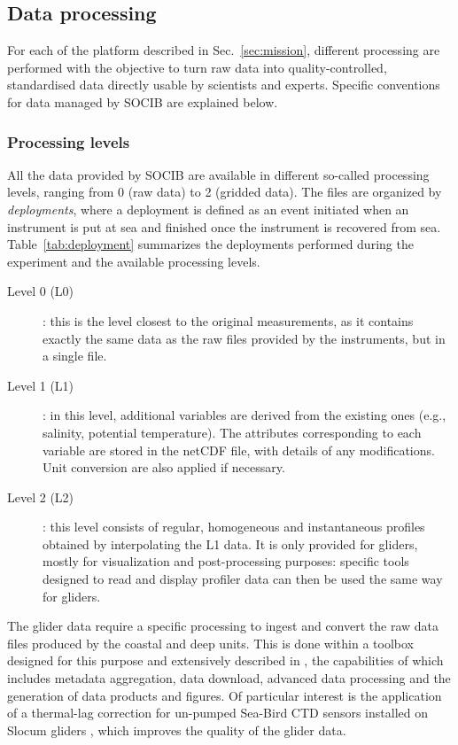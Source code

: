 \documentclass[essd]{copernicus}
\begin{document}
\subsection{Data processing\label{sec:processing}}

For each of the platform described in Sec.~\ref{sec:mission}, different processing are performed with the objective to turn raw data into quality-controlled, standardised data directly usable by scientists and experts. Specific conventions for data managed by SOCIB are explained below.

\subsubsection{Processing levels}

All the data provided by SOCIB are available in different so-called processing levels, ranging from 0 (raw data) to 2 (gridded data). The files are organized by \textit{deployments}, where a deployment is defined as an event initiated when an instrument is put at sea and finished once the instrument is recovered from sea. Table~\ref{tab:deployment} summarizes the deployments performed during the experiment and the available processing levels.

\begin{description}
\item[Level 0 (L0)]: this is the level closest to the original measurements, as it contains exactly the same data as the raw files provided by the instruments, but in a single file.
\item[Level 1 (L1)]: in this level, additional variables are derived from the existing ones (e.g., salinity, potential temperature). The attributes corresponding to each variable are stored in the netCDF file, with details of any modifications. Unit conversion are also applied if necessary.
\item[Level 2 (L2)]: this level consists of regular, homogeneous and instantaneous profiles obtained by interpolating the L1 data. It is only provided for gliders, mostly for visualization and post-processing purposes: specific tools designed to read and display profiler data can then be used the same way for gliders.
\end{description}
The glider data require a specific processing to ingest and convert the raw data files produced by the coastal and deep units. This is done within a toolbox designed for this purpose and extensively described in \citet{TROUPIN16}, the capabilities of which includes metadata aggregation, data download, advanced data processing and the generation of data products and figures. Of particular interest is the application of a thermal-lag correction for un-pumped Sea-Bird CTD sensors installed on Slocum gliders \citep{GARAU11}, which improves the quality of the glider data.
\end{document}
